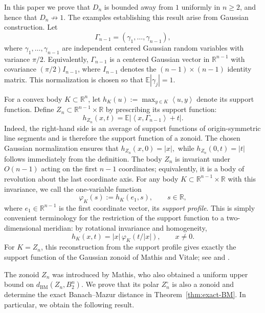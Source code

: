 \documentclass[11pt]{article}
\theoremstyle{definition}
\theoremstyle{remark}
\newcommand{\R}{\mathbb R}
\newcommand{\E}{\mathbb E}
\newcommand{\abs}[1]{\left|#1\right|}
\newcommand{\ip}[2]{\left\langle #1,#2\right\rangle}
\newcommand{\BM}{\mathrm{BM}}
\begin{document}
In this paper we prove that $D_n$ is bounded away from $1$ uniformly
in $n\ge 2$, and hence that $D_n\not\to1$.  The examples establishing this
result arise from Gaussian construction.  Let
\[
 \Gamma_{n-1}=(\gamma_1,\ldots,\gamma_{n-1}),
\]
where $\gamma_1,\ldots,\gamma_{n-1}$ are independent centered Gaussian
random variables with variance $\pi/2$.  Equivalently,
$\Gamma_{n-1}$ is a centered Gaussian vector in $\R^{n-1}$ with
covariance $(\pi/2)I_{n-1}$, where $I_{n-1}$ denotes the
$(n-1)\times(n-1)$ identity matrix.  This normalization is chosen so
that
$
 \E|\gamma_j|=1$. 
 
 For a convex body $K\subset\R^n$, let
$
 h_K(u):=\max_{y\in K}\ip{u}{y}
$
denote its support function.  Define
$Z_n\subset\R^{n-1}\times\R$ by prescribing its support function:
\begin{equation}\label{eq:Zn-intro}
 h_{Z_n}(x,t)
 =\E\abs{\ip{x}{\Gamma_{n-1}}+t}.
\end{equation}
Indeed, the right-hand side is an average of support functions of
origin-symmetric line segments and is therefore the support function
of a zonoid.  The chosen Gaussian normalization ensures that
$
 h_{Z_n}(x,0)=\abs{x},
$
while
$
 h_{Z_n}(0,t)=\abs{t}
$
follows immediately from the definition.
The body $Z_n$ is invariant under $O(n-1)$ acting on the
first $n-1$ coordinates; equivalently, it is a body of revolution
about the last coordinate axis.  For any body $K\subset\R^{n-1}\times\R$
with this invariance, we call the one-variable function
\[
 \varphi_K(s):=h_K(e_1,s),\qquad s\in\R,
\]
where $e_1\in\R^{n-1}$ is the first coordinate vector, its \emph{support
profile}.  This is simply convenient terminology for
the restriction of the support function to a two-dimensional meridian:
by rotational invariance and homogeneity,
\[
 h_K(x,t)=\abs{x}\,\varphi_K(t/\abs{x}),\qquad x\neq0.
\]
For $K=Z_n$, this reconstruction from the support profile gives exactly
the support function of the  Gaussian zonoid of Mathis and Vitale; see \cite[Theorem~3.1]{Vitale1991} and \cite[equation~(2.12) and the proof of
Theorem~2.10]{Mathis2025}. 

The zonoid $Z_n$ was introduced by Mathis, who also obtained a uniform upper bound on $d_{\BM}(Z_n,B_2^n)$. We prove that its polar $Z_n^\circ$ is also a zonoid and
determine the exact Banach--Mazur distance in
Theorem~\ref{thm:exact-BM}. In particular, we obtain the
following result.
\end{document}
